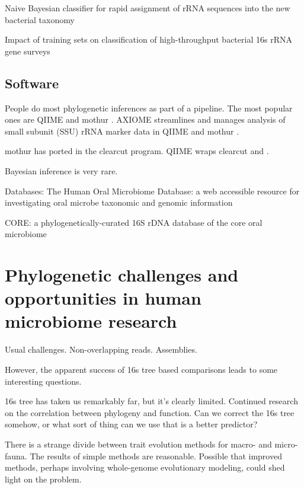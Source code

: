 \documentclass{amsart}
\begin{document}
\cite{huson2007megan}

\cite{wang2007naive}
{Naive Bayesian classifier for rapid assignment of rRNA sequences into the new bacterial taxonomy}

\cite{werner2011impact}
Impact of training sets on classification of high-throughput bacterial 16s rRNA gene surveys



\subsection{Software}

People do most phylogenetic inferences as part of a pipeline.
The most popular ones are QIIME \cite{caporaso2010qiime} and mothur \cite{schloss2009introducing}.
AXIOME streamlines and manages analysis of small subunit (SSU) rRNA marker data in QIIME and mothur \cite{lynch2013axiome}.

mothur has ported in the clearcut \cite{evans2006relaxed,sheneman2006clearcut} program.
QIIME wraps clearcut and \cite{price2010fasttree}.

Bayesian inference is very rare.

Databases:
\cite{chen2010human}
The Human Oral Microbiome Database: a web accessible resource for investigating oral microbe taxonomic and genomic information

\cite{griffen2011core}
CORE: a phylogenetically-curated 16S rDNA database of the core oral microbiome

\cite{srinivasan2012bacterial}


\section{Phylogenetic challenges and opportunities in human microbiome research}

Usual challenges.
Non-overlapping reads.
Assemblies.

However, the apparent success of 16s tree based comparisons leads to some interesting questions.

16s tree has taken us remarkably far, but it's clearly limited.
Continued research on the correlation between phylogeny and function.
Can we correct the 16s tree somehow, or what sort of thing can we use that is a better predictor?

There is a strange divide between trait evolution methods for macro- and micro-fauna.
The results of simple methods are reasonable.
Possible that improved methods, perhaps involving whole-genome evolutionary modeling, could shed light on the problem.
\end{document}
